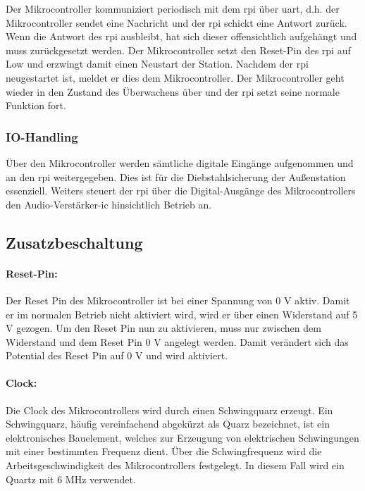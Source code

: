 Der Mikrocontroller kommuniziert periodisch mit dem \ac{rpi} über \ac{uart}, d.h. der Mikrocontroller sendet eine Nachricht und der \ac{rpi} schickt eine Antwort zurück.
Wenn die Antwort des \ac{rpi} ausbleibt, hat sich dieser offensichtlich aufgehängt und muss zurückgesetzt werden.
Der Mikrocontroller setzt den Reset-Pin des \ac{rpi} auf Low und erzwingt damit einen Neustart der Station.
Nachdem der \ac{rpi} neugestartet ist, meldet er dies dem Mikrocontroller.
Der Mikrocontroller geht wieder in den Zustand des Überwachens über und der \ac{rpi} setzt seine normale Funktion fort.

\subsubsection{IO-Handling}
Über den Mikrocontroller werden sämtliche digitale Eingänge aufgenommen und an den \ac{rpi} weitergegeben.
Dies ist für die Diebstahlsicherung der Außenstation essenziell.
Weiters steuert der \ac{rpi} über die Digital-Ausgänge des Mikrocontrollers den Audio-Verstärker-\ac{ic} hinsichtlich Betrieb an.

\subsection{Zusatzbeschaltung}
\paragraph{Reset-Pin:}
Der Reset Pin des Mikrocontroller ist bei einer Spannung von 0 V aktiv.
Damit er im normalen Betrieb nicht aktiviert wird, wird er über einen Widerstand auf 5 V gezogen.
Um den Reset Pin nun zu aktivieren, muss nur zwischen dem Widerstand und dem Reset Pin 0 V angelegt werden.
Damit verändert sich das Potential des Reset Pin auf 0 V und wird aktiviert.

\paragraph{Clock:}
Die Clock des Mikrocontrollers wird durch einen Schwingquarz erzeugt.
Ein Schwingquarz, häufig vereinfachend abgekürzt als Quarz bezeichnet, ist ein elektronisches Bauelement, welches zur Erzeugung von elektrischen Schwingungen mit einer bestimmten Frequenz dient.
Über die Schwingfrequenz wird die Arbeitsgeschwindigkeit des Mikrocontrollers festgelegt.
In diesem Fall wird ein Quartz mit 6 MHz verwendet.